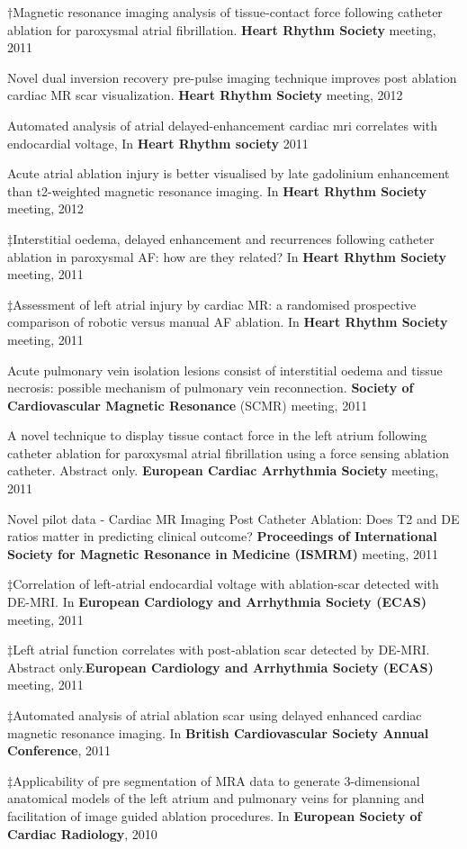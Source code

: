 \documentclass[letterpaper]{twentysecondcv} %
\begin{document}
\begin{etaremune}
\item $\dagger$Magnetic resonance imaging analysis of tissue-contact force following catheter ablation for paroxysmal atrial fibrillation. \textbf{Heart Rhythm Society} meeting, 2011 
\item Novel dual inversion recovery pre-pulse imaging technique improves post ablation cardiac MR scar visualization. \textbf{Heart Rhythm Society} meeting, 2012
\item Automated analysis of atrial delayed-enhancement cardiac mri correlates with endocardial voltage, In \textbf{Heart Rhythm society} 2011 
\item Acute atrial ablation injury is better visualised by late gadolinium enhancement than t2-weighted magnetic resonance imaging. In \textbf{Heart Rhythm Society} meeting, 2012
\item $\ddagger$Interstitial oedema, delayed enhancement and recurrences following catheter ablation in paroxysmal AF: how are they related? In \textbf{Heart Rhythm Society} meeting, 2011
\item $\ddagger$Assessment of left atrial injury by cardiac MR: a randomised prospective comparison of robotic versus manual AF ablation. In \textbf{Heart Rhythm Society} meeting, 2011
\item Acute pulmonary vein isolation lesions consist of interstitial oedema and tissue necrosis: possible mechanism of pulmonary vein reconnection. \textbf{Society of Cardiovascular Magnetic Resonance }(SCMR) meeting, 2011
\item A novel technique to display tissue contact force in the left atrium following catheter ablation for paroxysmal atrial fibrillation using a force sensing ablation catheter. Abstract only. \textbf{European Cardiac Arrhythmia Society} meeting, 2011
\item Novel pilot data - Cardiac MR Imaging Post Catheter Ablation: Does T2 and DE ratios matter in predicting clinical outcome? \textbf{Proceedings of International Society for Magnetic Resonance in Medicine (ISMRM)} meeting, 2011
\item $\ddagger$Correlation of left-atrial endocardial voltage with ablation-scar detected with DE-MRI. In \textbf{European Cardiology and Arrhythmia Society (ECAS)} meeting, 2011
\item $\ddagger$Left atrial function correlates with post-ablation scar detected by DE-MRI. Abstract only.\textbf{European Cardiology and Arrhythmia Society (ECAS)} meeting, 2011
\item $\ddagger$Automated analysis of atrial ablation scar using delayed enhanced cardiac magnetic resonance imaging. In \textbf{British Cardiovascular Society Annual Conference}, 2011
\item $\ddagger$Applicability of pre segmentation of MRA data to generate 3-dimensional anatomical models of the left atrium and pulmonary veins for planning and facilitation of image guided ablation procedures. In \textbf{European Society of Cardiac Radiology}, 2010 


\end{etaremune}
\end{document}
